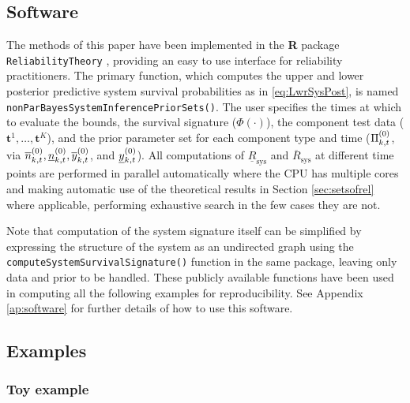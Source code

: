 \documentclass[12pt, a4paper]{elsarticle}
\newcommand{\bs}[1]{\boldsymbol{#1}}
\renewcommand{\vec}[1]{{\bs#1}}
\newcommand{\ul}[1]{\underline{#1}}
\newcommand{\ol}[1]{\overline{#1}}
\newcommand{\lRsys}{\ul{R}_\text{sys}}
\newcommand{\uRsys}{\ol{R}_\text{sys}}
\begin{document}

\subsection{Software}

The methods of this paper have been implemented in the \textbf{R}
\citep{R} package \texttt{ReliabilityTheory} \citep{2015:aslett-RT},
providing an easy to use interface for reliability practitioners.  The
primary function, which computes the upper and lower posterior
predictive system survival probabilities as in \eqref{eq:LwrSysPost}, is
named \texttt{nonParBayesSystemInferencePriorSets()}.  The user
specifies the times at which to evaluate the bounds, the survival
signature ($\Phi(\cdot)$), the component test data ($\vec{t}^1, \ldots,
\vec{t}^K$), and the prior parameter set for each component type and
time ($\Pi^{(0)}_{k,t}$, via $\nzu_{k,t}, \nzl_{k,t}, \yzu_{k,t}$, and
$\yzl_{k,t}$).  All computations of $\lRsys$
and $\uRsys$ at different time points are performed in parallel
automatically where the CPU has multiple cores and making automatic
use of the theoretical results in Section \ref{sec:setsofrel} where
applicable, performing exhaustive search in the few cases they are not.

Note that computation of the system signature itself can be simplified by
expressing the structure of the system as an undirected graph using the
\texttt{computeSystemSurvivalSignature()} function in the same package,
leaving only data and prior to be handled.  These publicly available
functions have been used in computing all the following examples for
reproducibility.  See Appendix \ref{ap:software} for further details of how to use this software.

\subsection{Examples}

\subsubsection{Toy example}
\end{document}
